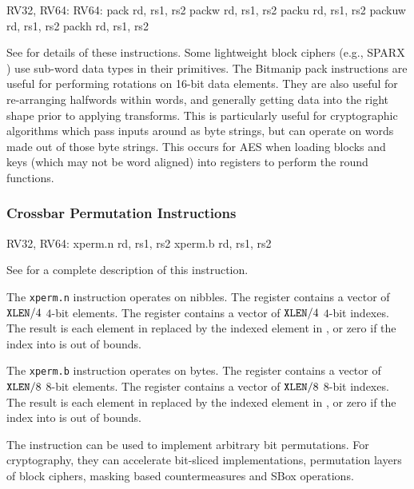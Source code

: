 \begin{cryptobitmanipisa}
RV32, RV64:                         RV64: 
    pack   rd, rs1, rs2                 packw  rd, rs1, rs2
    packu  rd, rs1, rs2                 packuw rd, rs1, rs2
    packh  rd, rs1, rs2
\end{cryptobitmanipisa}

See \cite[Section 2.1.4]{riscv:bitmanip:draft} for details of
these instructions.
Some lightweight block ciphers
(e.g., SPARX \cite{DPUVGB:16})
use sub-word data types in their primitives.
The Bitmanip pack instructions are useful for performing rotations on
16-bit data elements.
They are also useful for re-arranging halfwords within words, and
generally getting data into the right shape prior to applying transforms.
This is particularly useful for cryptographic algorithms which pass inputs
around as byte strings, but can operate on words made out of those byte
strings.
This occurs for AES when loading blocks and keys (which may not be
word aligned) into registers to perform the round functions.


\subsubsection{Crossbar Permutation Instructions}
\label{sec:xperm}

\begin{cryptobitmanipisa}
RV32, RV64:
    xperm.n rd, rs1, rs2
    xperm.b rd, rs1, rs2
\end{cryptobitmanipisa}

See \cite[Section 2.2.4]{riscv:bitmanip:draft} for a complete
description of this instruction.

The {\tt xperm.n} instruction operates on nibbles.
The \rsone register contains a vector of ${\tt XLEN}/4$ $4$-bit elements.
The \rstwo register contains a vector of ${\tt XLEN}/4$ $4$-bit indexes.
The result is each element in \rstwo replaced by the indexed element
in \rsone, or zero if the index into \rstwo is out of bounds.

The {\tt xperm.b} instruction operates on bytes.
The \rsone register contains a vector of ${\tt XLEN}/8$ $8$-bit elements.
The \rstwo register contains a vector of ${\tt XLEN}/8$ $8$-bit indexes.
The result is each element in \rstwo replaced by the indexed element
in \rsone, or zero if the index into \rstwo is out of bounds.

The instruction can be used to implement arbitrary bit
permutations.
For cryptography, they can accelerate bit-sliced implementations,
permutation layers of block ciphers, masking based countermeasures
and SBox operations.

